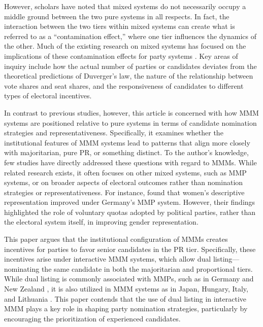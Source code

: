 \documentclass[a4paper, 11pt]{article}
\begin{document}
However, scholars have noted that mixed systems do not necessarily occupy a middle ground between the two pure systems in all respects. In fact, the interaction between the two tiers within mixed systems can create what is referred to as a “contamination effect,” where one tier influences the dynamics of the other. Much of the existing research on mixed systems has focused on the implications of these contamination effects for party systems \citep{bawnComparativeTheoryElectoral2003, coxInteractionEffectsMixedMember2002, ferraraMixedElectoralSystems2005, herronContaminationEffectsNumber2001, nishikawaMixedElectoralRules2004, moserMixedElectoralSystems2004}. Key areas of inquiry include how the actual number of parties or candidates deviates from the theoretical predictions of Duverger’s law, the nature of the relationship between vote shares and seat shares, and the responsiveness of candidates to different types of electoral incentives.

In contrast to previous studies, however, this article is concerned with how MMM systems are positioned relative to pure systems in terms of candidate nomination strategies and representativeness. Specifically, it examines whether the institutional features of MMM systems lead to patterns that align more closely with majoritarian, pure PR, or something distinct. To the author’s knowledge, few studies have directly addressed these questions with regard to MMMs. While related research exists, it often focuses on other mixed systems, such as MMP systems, or on broader aspects of electoral outcomes rather than nomination strategies or representativeness. For instance, \citet{fortin-rittbergerGenderEqualBundestagImpact2013} found that women’s descriptive representation improved under Germany’s MMP system. However, their findings highlighted the role of voluntary quotas adopted by political parties, rather than the electoral system itself, in improving gender representation.

This paper argues that the institutional configuration of MMMs creates incentives for parties to favor senior candidates in the PR tier. Specifically, these incentives arise under interactive MMM systems, which allow dual listing—nominating the same candidate in both the majoritarian and proportional tiers. While dual listing is commonly associated with MMPs, such as in Germany and New Zealand \citep{konoDualCandidacyRemedy2020, electoralcommisionofnewzealandNewZealandsElectoral2014}, it is also utilized in MMM systems as in Japan, Hungary, Italy, and Lithuania \citep{pappDualCandidacySource2021, lemondeHowDoesItalian2022, thecentralelectoralcommissionoftherepublicoflithuaniaElectionsReferendum2024}. This paper contends that the use of dual listing in interactive MMM plays a key role in shaping party nomination strategies, particularly by encouraging the prioritization of experienced candidates.
\end{document}
